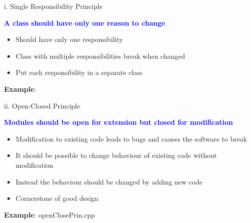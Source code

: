 \documentclass[13pt]{beamer}
\begin{document}
\begin{frame}{i. Single Responsibility Principle}
	\begin{center}
		\textcolor{blue}{\textbf{A class should have only one reason to change}}
	\end{center}
	\begin{itemize}
		\item Should have only one responsibility
		\item Class with multiple responsibilities break when changed
		\item Put each responsibility in a separate class
	\end{itemize}
	\textbf{Example}:                                        
	\begin{center}
	\end{center}
\end{frame}

\begin{frame}{ii. Open-Closed Principle}
	\begin{center}
		\textcolor{blue}{\textbf{Modules should be open for extension but closed for 						modification}}
	\end{center}
	
	\begin{itemize}
		\setlength\itemsep{1em} 
		\item Modification to existing code leads to bugs and causes the software to break
		\item It should be possible to change behaviour of existing code without modification
		\item Instead the behaviour should be changed by adding new code
		\item Cornerstone of good design
	\end{itemize}            
	\textbf{Example}: openClosePrin.cpp
\end{frame}
\end{document}
